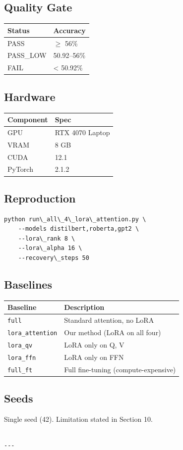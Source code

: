 \subsection{Quality Gate}

\begin{table}[H]
\centering
\small
\begin{tabular}{ll}
\toprule
\textbf{Status} & \textbf{Accuracy} \\
\midrule
PASS & $\ge$ 56\% \\
PASS\_LOW & 50.92--56\% \\
FAIL & \textless{} 50.92\% \\
\bottomrule
\end{tabular}
\end{table}

\subsection{Hardware}

\begin{table}[H]
\centering
\small
\begin{tabular}{ll}
\toprule
\textbf{Component} & \textbf{Spec} \\
\midrule
GPU & RTX 4070 Laptop \\
VRAM & 8 GB \\
CUDA & 12.1 \\
PyTorch & 2.1.2 \\
\bottomrule
\end{tabular}
\end{table}

\subsection{Reproduction}

\begin{lstlisting}
python run\_all\_4\_lora\_attention.py \
    --models distilbert,roberta,gpt2 \
    --lora\_rank 8 \
    --lora\_alpha 16 \
    --recovery\_steps 50
\end{lstlisting}

\subsection{Baselines}

\begin{table}[H]
\centering
\small
\begin{tabular}{ll}
\toprule
\textbf{Baseline} & \textbf{Description} \\
\midrule
\texttt{full} & Standard attention, no LoRA \\
\texttt{lora\_attention} & Our method (LoRA on all four) \\
\texttt{lora\_qv} & LoRA only on Q, V \\
\texttt{lora\_ffn} & LoRA only on FFN \\
\texttt{full\_ft} & Full fine-tuning (compute-expensive) \\
\bottomrule
\end{tabular}
\end{table}

\subsection{Seeds}

Single seed (42). Limitation stated in Section 10.
\begin{lstlisting}

---
\end{lstlisting}
